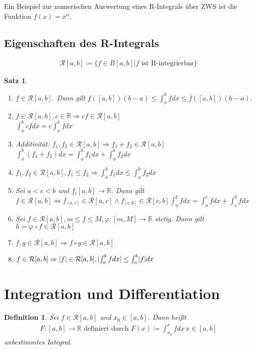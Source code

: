 \documentclass[ngerman,titlepage,twoside, parskip=half*]{scrreprt}
\newcommand*{\R}{\mathbb{R}}
\newcommand*{\RR}{\mathcal{R}}
\theoremstyle{break}
\newtheorem{theorem}{Satz}[section]
\newtheorem{definition}{Definition}[chapter]
\theoremstyle{nonumberbreak}
\DeclarePairedDelimiter{\abs}{\lvert}{\rvert}
\begin{document}
Ein Beispiel zur numerischen Auswertung eines R-Integrals über ZWS ist die
Funktion $f(x)=x^\alpha$.

\subsection{Eigenschaften des R-Integrals}
\begin{gather*}\RR[a,b]\coloneqq\{f\in B[a,b] | f \text{ ist R-integrierbar}\}\end{gather*}

\begin{theorem}
  \begin{enumerate}
    \item $f\in\RR[a,b]$. Dann gilt $\underline{f}([a,b])(b-a)\leq\int_a^b
      fdx\leq \overline{f}([a,b])(b-a)$.
    \item $f\in\RR[a,b], c\in\R\Rightarrow cf\in\RR[a,b]$\\
      $\int_a^b cfdx=c\int_a^b fdx$
    \item Additivität: $f_1,f_2\in\RR[a,b]\Rightarrow f_1+f_2\in\RR[a,b]$\\
      $\int_a^b (f_1+f_2)dx=\int_a^b f_1dx + \int_a^b f_2dx$
    \item $f_1,f_2\in\RR[a,b], f_1\leq f_2\Rightarrow \int_a^b f_1dx\leq 
      \int_a^b f_2dx$
    \item Sei $a<c<b$ und $f_i[a,b]\rightarrow\R$. Dann gilt $f\in\RR[a,b]
      \Leftrightarrow f_{[a,c]}\in\RR[a,c]\wedge f_{[c,b]}\in\RR[c,b]
      \int_a^b fdx=\int_a^c fdx + \int_c^b fdx$
    \item Sei $f\in\RR[a,b], m\leq f\leq M, \varphi\colon[m,M]\rightarrow\R$ stetig.
      Dann gilt $h=\varphi\circ f\in\RR[a,b]$
    \item $f,g\in\RR[a,b]\Rightarrow f\circ g \in\RR[a,b]$
    \item $f\in\RR[a,b]\Rightarrow \abs{f}\in\RR[a,b], \abs{\int_a^b fdx}\leq\int_a^b
      \abs{f}dx$
  \end{enumerate}
\end{theorem}

\section{Integration und Differentiation}

\begin{definition}
  Sei $f\in\RR[a,b]$ und $x_0\in[a,b]$. Dann heißt
  \begin{gather*}F\colon[a,b]\rightarrow\R\text{ definiert durch }
  F(x)\coloneqq\int_{x_0}^x fdx\,x\in[a,b]\end{gather*}
  \emph{unbestimmtes Integral}.
\end{definition}
\end{document}
